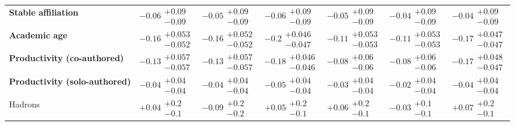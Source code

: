 \begin{table}[H]
\begin{tabular}{lllllll}
\textbf{Stable affiliation}               &         $-0.06\substack{+0.09 \\ -0.09}$ &         $-0.05\substack{+0.09 \\ -0.09}$ &         $-0.06\substack{+0.09 \\ -0.09}$ &         $-0.05\substack{+0.09 \\ -0.09}$ &         $-0.04\substack{+0.09 \\ -0.09}$ &         $-0.04\substack{+0.09 \\ -0.09}$ \\
\textbf{Academic age}                     &  $\bm{-0.16}\substack{+0.053 \\ -0.052}$ &  $\bm{-0.16}\substack{+0.052 \\ -0.052}$ &   $\bm{-0.2}\substack{+0.046 \\ -0.047}$ &  $\bm{-0.11}\substack{+0.053 \\ -0.053}$ &  $\bm{-0.11}\substack{+0.053 \\ -0.053}$ &  $\bm{-0.17}\substack{+0.047 \\ -0.047}$ \\
\textbf{Productivity (co-authored)}       &  $\bm{-0.13}\substack{+0.057 \\ -0.057}$ &  $\bm{-0.13}\substack{+0.057 \\ -0.057}$ &  $\bm{-0.18}\substack{+0.046 \\ -0.046}$ &    $\bm{-0.08}\substack{+0.06 \\ -0.06}$ &    $\bm{-0.08}\substack{+0.06 \\ -0.06}$ &  $\bm{-0.17}\substack{+0.048 \\ -0.047}$ \\
\textbf{Productivity (solo-authored)}     &    $\bm{-0.04}\substack{+0.04 \\ -0.04}$ &         $-0.04\substack{+0.04 \\ -0.04}$ &    $\bm{-0.05}\substack{+0.04 \\ -0.04}$ &         $-0.03\substack{+0.04 \\ -0.04}$ &         $-0.02\substack{+0.04 \\ -0.04}$ &         $-0.04\substack{+0.04 \\ -0.04}$ \\
\hline Hadrons                                   &           $+0.04\substack{+0.2 \\ -0.1}$ &           $-0.09\substack{+0.2 \\ -0.2}$ &           $+0.05\substack{+0.2 \\ -0.1}$ &           $+0.06\substack{+0.2 \\ -0.1}$ &           $-0.03\substack{+0.1 \\ -0.1}$ &           $+0.07\substack{+0.2 \\ -0.1}$ \\

\end{tabular}
\end{table}

